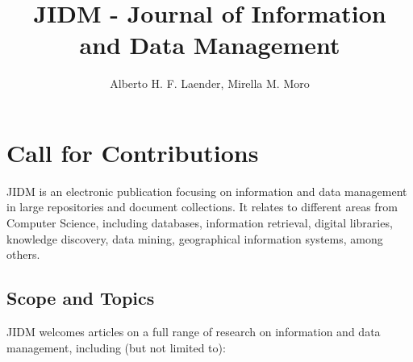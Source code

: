 \documentclass[jidm,a4paper]{jidm} %
\title{JIDM - Journal of Information \\ and Data Management}
\author{Alberto H. F. Laender, Mirella M. Moro}
\institute{Universidade Federal de Minas Gerais, Brazil \\ \email{\{laender, mirella\}@dcc.ufmg.br}
}
\begin{document}
\begin{bottomstuff}
\end{bottomstuff}

\maketitle


\section{Call for Contributions}

JIDM is an electronic publication focusing on information and data management in large repositories and document collections. It relates to different areas from Computer Science, including databases, information retrieval, digital libraries, knowledge discovery, data mining, geographical information systems, among others.

\subsection{Scope and Topics}

JIDM welcomes articles on a full range of research on information and data management, including (but not limited to):
\end{document}
